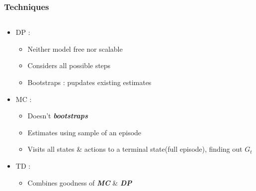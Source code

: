 \documentclass{beamer} %
\begin{document}
\begin{frame}
\frametitle{Techniques}
\begin{columns}
    \begin{column}{.5\textwidth}
     	\begin{block}{}
			\begin{itemize}
				\item DP : 
					\begin{itemize}
						\item Neither model free nor scalable
						\item Considers all possible steps
						\item Bootstraps : pupdates existing estimates
					\end{itemize}
				\item MC : 
					\begin{itemize}
						\item Doesn't \textbf{\textit{bootstraps}}
						\item Estimates using sample of an episode
						\item Visits all states \& actions to a terminal state(full episode), finding out $G_t$
					\end{itemize}
				\item TD :
					\begin{itemize}
						\item Combines goodness of  \textbf{\textit{MC}} \& \textbf{\textit{DP}}
				

\end{itemize}
\end{itemize}
\end{block}
\end{column}
\end{columns}
\end{frame}
\end{document}

